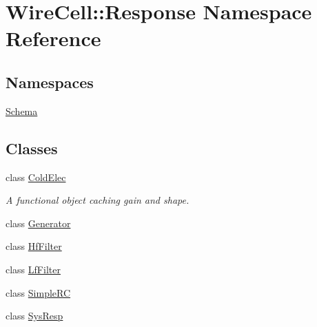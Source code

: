 \hypertarget{namespace_wire_cell_1_1_response}{}\section{Wire\+Cell\+:\+:Response Namespace Reference}
\label{namespace_wire_cell_1_1_response}
\subsection*{Namespaces}
\begin{DoxyCompactItemize}
\item 
 \hyperlink{namespace_wire_cell_1_1_response_1_1_schema}{Schema}
\end{DoxyCompactItemize}
\subsection*{Classes}
\begin{DoxyCompactItemize}
\item 
class \hyperlink{class_wire_cell_1_1_response_1_1_cold_elec}{Cold\+Elec}
\begin{DoxyCompactList}\small\item\em A functional object caching gain and shape. \end{DoxyCompactList}\item 
class \hyperlink{class_wire_cell_1_1_response_1_1_generator}{Generator}
\item 
class \hyperlink{class_wire_cell_1_1_response_1_1_hf_filter}{Hf\+Filter}
\item 
class \hyperlink{class_wire_cell_1_1_response_1_1_lf_filter}{Lf\+Filter}
\item 
class \hyperlink{class_wire_cell_1_1_response_1_1_simple_r_c}{Simple\+RC}
\item 
class \hyperlink{class_wire_cell_1_1_response_1_1_sys_resp}{Sys\+Resp}
\end{DoxyCompactItemize}
